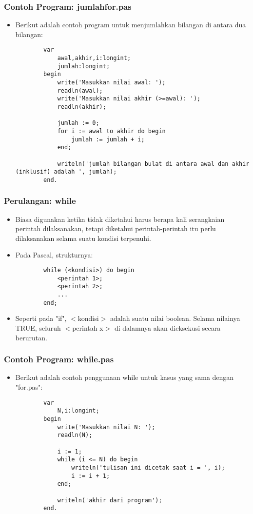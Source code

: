 \documentclass{beamer}
\begin{document}
\begin{frame}[fragile]
\frametitle{Contoh Program: jumlahfor.pas}
\begin{itemize}
	\item Berikut adalah contoh program untuk menjumlahkan bilangan di antara dua bilangan:
	\begin{lstlisting}
		var
		    awal,akhir,i:longint;
		    jumlah:longint;
		begin
		    write('Masukkan nilai awal: ');
		    readln(awal);
		    write('Masukkan nilai akhir (>=awal): ');
		    readln(akhir);
		
		    jumlah := 0;
		    for i := awal to akhir do begin
		        jumlah := jumlah + i;
		    end;
		
		    writeln('jumlah bilangan bulat di antara awal dan akhir (inklusif) adalah ', jumlah);
		end.
	\end{lstlisting}
\end{itemize}
\end{frame}

\begin{frame}[fragile]
\frametitle{Perulangan: while}
\begin{itemize}
	\item Biasa digunakan ketika tidak diketahui harus berapa kali serangkaian perintah dilaksanakan, tetapi diketahui perintah-perintah itu perlu dilaksanakan selama suatu kondisi terpenuhi.
	\item Pada Pascal, strukturnya:
	\begin{lstlisting}
		while (<kondisi>) do begin
		    <perintah 1>;
		    <perintah 2>;
		    ...
		end;
	\end{lstlisting}
	\item Seperti pada "if", $<$kondisi$>$ adalah suatu nilai boolean. Selama nilainya TRUE, seluruh $<$perintah x$>$ di dalamnya akan dieksekusi secara berurutan.
\end{itemize}
\end{frame}

\begin{frame}[fragile]
\frametitle{Contoh Program: while.pas}
\begin{itemize}
	\item Berikut adalah contoh penggunaan while untuk kasus yang sama dengan "for.pas":
	\begin{lstlisting}
		var
		    N,i:longint;
		begin
		    write('Masukkan nilai N: ');
		    readln(N);
		
		    i := 1;
		    while (i <= N) do begin
		        writeln('tulisan ini dicetak saat i = ', i);
		        i := i + 1;
		    end;
		
		    writeln('akhir dari program');
		end.
	\end{lstlisting}
\end{itemize}
\end{frame}
\end{document}
